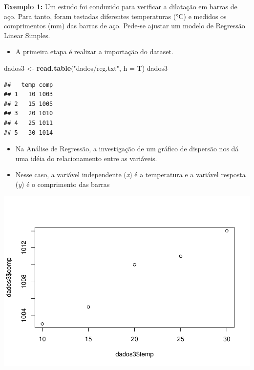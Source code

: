 \documentclass[
]{book}
\newenvironment{Shaded}{\begin{snugshade}}{\end{snugshade}}
\newcommand{\AttributeTok}[1]{\textcolor[rgb]{0.13,0.29,0.53}{#1}}
\newcommand{\FunctionTok}[1]{\textcolor[rgb]{0.13,0.29,0.53}{\textbf{#1}}}
\newcommand{\NormalTok}[1]{#1}
\newcommand{\OtherTok}[1]{\textcolor[rgb]{0.56,0.35,0.01}{#1}}
\newcommand{\SpecialCharTok}[1]{\textcolor[rgb]{0.81,0.36,0.00}{\textbf{#1}}}
\newcommand{\StringTok}[1]{\textcolor[rgb]{0.31,0.60,0.02}{#1}}
\providecommand{\tightlist}{%
  \setlength{\itemsep}{0pt}\setlength{\parskip}{0pt}}
\begin{document}
\textbf{Exemplo 1:} Um estudo foi conduzido para verificar a dilatação em barras de aço. Para tanto, foram testadas diferentes temperaturas (°C) e medidos os comprimentos (mm) das barras de aço. Pede-se ajustar um modelo de Regressão Linear Simples.

\begin{itemize}
\tightlist
\item
  A primeira etapa é realizar a importação do dataset.
\end{itemize}

\begin{Shaded}
\begin{Highlighting}[]
\NormalTok{dados3 }\OtherTok{\textless{}{-}} \FunctionTok{read.table}\NormalTok{(}\StringTok{"dados/reg.txt"}\NormalTok{, }\AttributeTok{h =}\NormalTok{ T)}
\NormalTok{dados3}
\end{Highlighting}
\end{Shaded}

\begin{verbatim}
##   temp comp
## 1   10 1003
## 2   15 1005
## 3   20 1010
## 4   25 1011
## 5   30 1014
\end{verbatim}

\begin{itemize}
\tightlist
\item
  Na Análise de Regressão, a investigação de um gráfico de dispersão nos dá uma idéia do relacionamento entre as variáveis.
\item
  Nesse caso, a variável independente (\emph{x}) é a temperatura e a variável resposta (\emph{y}) é o comprimento das barras
\end{itemize}

\begin{Shaded}
\end{Shaded}

\includegraphics[width=0.5\linewidth]{_main_files/figure-latex/exp2-1}
\end{document}
